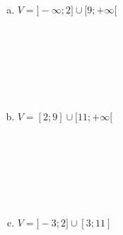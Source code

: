 \documentclass[a4paper,14pt]{article}
\begin{document}
\begin{multicols}{2}
\begin{enumerate}
\begin{enumerate}[a)]
    			\\\\\\\\\\\\\\
    			\item $V = ]-\infty; 2] \cup [9; +\infty[$
    			\\\\\\\\\\\\\\
    			\item $V = [2; 9] \cup [11; +\infty[$
    			\\\\\\\\\\\\\\
    			\item $V = ]-3; 2] \cup [3; 11]$
    		\end{enumerate}
    	\end{enumerate}
    $~$ \\ $~$ \\ $~$
    \end{multicols}
\end{document}
